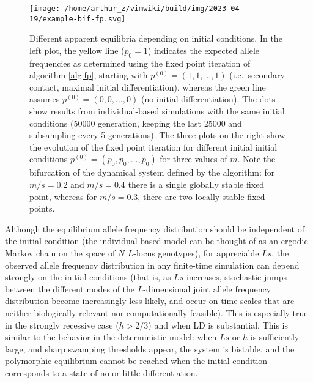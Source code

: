 \documentclass[
  11pt,
]{article}
\begin{document}
\begin{figure}
\centering
\texttt{[image: /home/arthur\_z/vimwiki/build/img/2023-04-19/example-bif-fp.svg]}
\caption{Different apparent equilibria depending on initial conditions.
In the left plot, the yellow line (\(p_0 = 1\)) indicates the expected
allele frequencies as determined using the fixed point iteration of
algorithm \autoref{alg:fp}, starting with \(p^{(0)} = (1,1,\dots,1)\)
(i.e.~secondary contact, maximal initial differentiation), whereas the
green line assumes \(p^{(0)} = (0,0,\dots,0)\) (no initial
differentiation). The dots show results from individual-based
simulations with the same initial conditions (50000 generation, keeping
the last 25000 and subsampling every 5 generations). The three plots on
the right show the evolution of the fixed point iteration for different
initial initial conditions \(p^{(0)} = (p_0, p_0, \dots, p_0)\) for
three values of \(m\). Note the bifurcation of the dynamical system
defined by the algorithm: for \(m/s = 0.2\) and \(m/s=0.4\) there is a
single globally stable fixed point, whereas for \(m/s = 0.3\), there are
two locally stable fixed points. \label{fig:bifurcation}}
\end{figure}

Although the equilibrium allele frequency distribution should be
independent of the initial condition (the individual-based model can be
thought of as an ergodic Markov chain on the space of \(N\) \(L\)-locus
genotypes), for appreciable \(Ls\), the observed allele frequency
distribution in any finite-time simulation can depend strongly on the
initial conditions (that is, as \(Ls\) increases, stochastic jumps
between the different modes of the \(L\)-dimensional joint allele
frequency distribution become increasingly less likely, and occur on
time scales that are neither biologically relevant nor computationally
feasible). This is especially true in the strongly recessive case
(\(h > 2/3\)) and when LD is substantial. This is similar to the
behavior in the deterministic model: when \(Ls\) or \(h\) is
sufficiently large, and sharp swamping thresholds appear, the system is
bistable, and the polymorphic equilibrium cannot be reached when the
initial condition corresponds to a state of no or little
differentiation.
\end{document}
